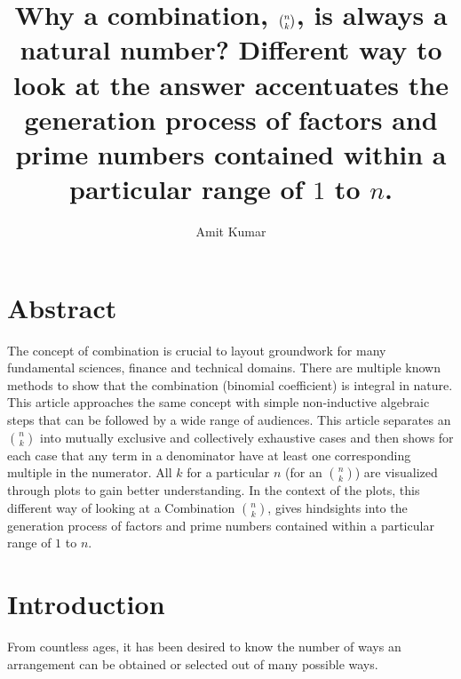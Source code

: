 \documentclass[10pt, twoside]{article}
\title{Why a combination, $\Combination{n}{k}$, is always a natural number? Different way to look at the answer accentuates the generation process of factors and prime numbers contained within a particular range of $1$ to $n$.}
\author{Amit Kumar}
\date{}
\newcommand*{\Combination}[2]{\binom{#1}{#2}}%
\begin{document}
	\maketitle
	\section{Abstract}
	 The concept of combination is crucial to layout groundwork for many fundamental sciences, finance and technical domains. There are multiple known methods to show that the combination (binomial coefficient) is integral in nature. This article approaches the same concept with simple non-inductive algebraic steps that can be followed by a wide range of audiences. This article separates an $\Combination{n}{k}$ into mutually exclusive and collectively exhaustive cases and then shows for each case that any term in a denominator have at least one corresponding multiple in the numerator. All $k$ for a particular $n$ (for an $\Combination{n}{k}$) are visualized through plots to gain better understanding. In the context of the plots, this different way of looking at a Combination $\Combination{n}{k}$, gives hindsights into the generation process of factors and prime numbers contained within a particular range of $1$ to $n$.
	\section{Introduction}
	From countless ages, it has been desired to know the number of ways an arrangement can be obtained or selected out of many possible ways.
	
\end{document}
